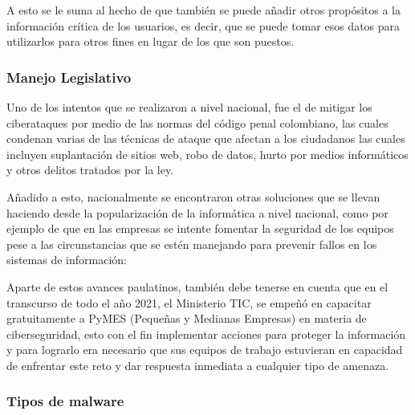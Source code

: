 A esto se le suma al hecho de que también se puede añadir otros propósitos a la
información crítica de los usuarios, es decir, que se puede tomar esos datos
para utilizarlos para otros fines en lugar de los que son puestos.
\parencite{Banja2020}

\subsubsection{Manejo Legislativo}

Uno de los intentos que se realizaron a nivel nacional, fue el de mitigar los
ciberataques por medio de las normas del código penal colombiano, las cuales
condenan varias de las técnicas de ataque que afectan a los ciudadanos las
cuales incluyen suplantación de sitios web, robo de datos, hurto por medios
informáticos y otros delitos tratados por la ley. \parencite[Ley 1273 de 2009.
Por medio de la cual se modifica el Código Penal, se crea un nuevo bien jurídico
tutelado - denominado “de la protección de la información y de los datos”- y se
preservan integralmente los sistemas que utilicen las tecnologías de la
información y las comunicaciones, entre otras disposiciones. 5 de enero de 2009.
D.O. No. 47223, como se cita en][]{Mosquera2019}

Añadido a esto, nacionalmente se encontraron otras soluciones que se llevan
haciendo desde la popularización de la informática a nivel nacional, como por
ejemplo de que en las empresas se intente fomentar la seguridad de los equipos
pese a las circunstancias que se estén manejando para prevenir fallos en los
sistemas de información:

\begin{displayquote}
  Aparte de estos avances paulatinos, también debe tenerse en cuenta que en el
  transcurso de todo el año 2021, el Ministerio TIC, se empeñó en capacitar
  gratuitamente a PyMES (Pequeñas y Medianas Empresas) en materia de
  ciberseguridad, esto con el fin implementar acciones para proteger la
  información y para lograrlo era necesario que sus equipos de trabajo
  estuvieran en capacidad de enfrentar este reto y dar respuesta inmediata a
  cualquier tipo de amenaza.
  \parencite[MinTic, 2021, como se cita en][]{Bueno2022}
\end{displayquote}

\subsubsection{Tipos de malware}

